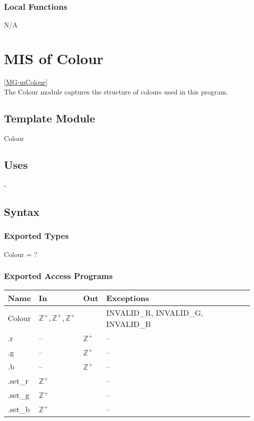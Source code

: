 \documentclass[12pt, titlepage]{article}
\begin{document}
\subsubsection{Local Functions}
N/A

\newpage

\section{MIS of Colour} \ref{MG-mColour} \\
The Colour module captures the structure of colours used in this program.

\subsection{Template Module}
Colour

\subsection{Uses} -

\subsection{Syntax}
\subsubsection{Exported Types}
Colour = ?

\subsubsection{Exported Access Programs}
\begin{center}
	\begin{tabular}{p{4cm} p{2cm} p{2cm} p{4cm}}
		\hline
		\textbf{Name} & \textbf{In} & \textbf{Out} & \textbf{Exceptions} \\
		\hline
		Colour & $\mathbb{Z}^+,\mathbb{Z}^+,\mathbb{Z}^+$ & & INVALID\_R, 
		INVALID\_G, INVALID\_B \\
		.r & -- & $\mathbb{Z}^+$ & -- \\
		.g & -- & $\mathbb{Z}^+$ & -- \\		
		.b & -- & $\mathbb{Z}^+$ & -- \\		%
		.set\_r & $\mathbb{Z}^+$ & & -- \\
		.set\_g & $\mathbb{Z}^+$ & & -- \\		
		.set\_b & $\mathbb{Z}^+$ & & -- \\		%
		\hline
	\end{tabular}
\end{center}
\end{document}

